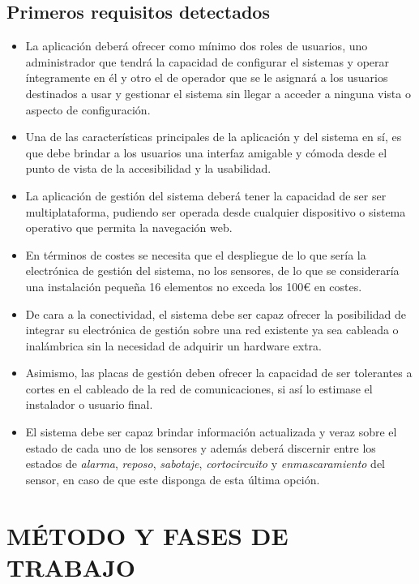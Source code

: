 \documentclass{pre-tfg}
\begin{document}
\subsection{Primeros requisitos detectados}
\begin{itemize}
\item La aplicación deberá ofrecer como mínimo dos roles de usuarios, uno administrador que
  tendrá la capacidad de configurar el sistemas y operar íntegramente en él y otro el de
  operador que se le asignará a los usuarios destinados a usar y gestionar el sistema sin
  llegar a acceder a ninguna vista o aspecto de configuración.
\item Una de las características principales de la aplicación y del sistema en sí, es que
  debe brindar a los usuarios una interfaz amigable y cómoda desde el punto de vista de
  la accesibilidad y la usabilidad.
\item La aplicación de gestión del sistema deberá tener la capacidad de ser ser
  multiplataforma, pudiendo ser operada desde cualquier dispositivo o sistema operativo
  que permita la navegación web.
\item En términos de costes se necesita que el despliegue de lo que sería la electrónica
  de gestión del sistema, no los sensores, de lo que se consideraría una instalación
  pequeña 16 elementos no exceda los 100€ en costes.
\item De cara a la conectividad, el sistema debe ser capaz ofrecer la posibilidad de
  integrar su electrónica de gestión sobre una red existente ya sea cableada o inalámbrica
  sin la necesidad de adquirir un hardware extra.
\item Asimismo, las placas de gestión deben ofrecer la capacidad de ser tolerantes a
  cortes en el cableado de la red de comunicaciones, si así lo estimase el instalador o
  usuario final.
\item El sistema debe ser capaz brindar información actualizada y veraz sobre el estado de
  cada uno de los sensores y además deberá discernir entre los estados de \textit{alarma},
  \textit{reposo}, \textit{sabotaje}, \textit{cortocircuito} y \textit{enmascaramiento}
  del sensor, en caso de que este disponga de esta última opción.
\end{itemize}


\section{MÉTODO Y FASES DE TRABAJO}
\end{document}
